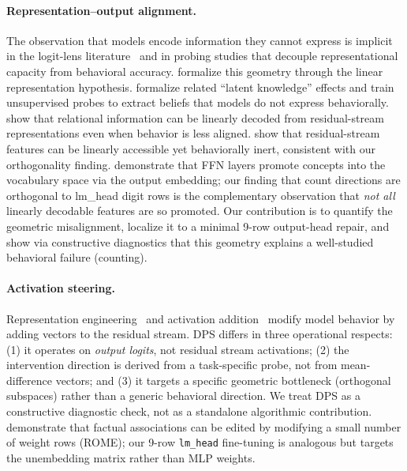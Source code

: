 \documentclass{article}
\begin{document}
\paragraph{Representation--output alignment.}
The observation that models encode information they cannot express is implicit in the
logit-lens literature~\citep{nostalgebraist2020logitlens,belrose2023eliciting} and in probing studies that
decouple representational capacity from behavioral accuracy.
\citet{park2023linear} formalize this geometry through the linear representation hypothesis.
\citet{burns2023discovering} formalize related ``latent knowledge'' effects and train
unsupervised probes to extract beliefs that models do not express behaviorally.
\citet{hernandez2024linearity} show that relational information can be linearly decoded
from residual-stream representations even when behavior is less aligned.
\citet{din2023jump} show that residual-stream features can be linearly accessible
yet behaviorally inert, consistent with our orthogonality finding.
\citet{geva2021transformer,geva2022transformer} demonstrate that FFN layers promote
concepts into the vocabulary space via the output embedding; our finding that
count directions are orthogonal to lm\_head digit rows is the complementary
observation that \emph{not all} linearly decodable features are so promoted.
Our contribution is to quantify the geometric misalignment, localize it to a minimal
9-row output-head repair, and show via constructive diagnostics that this geometry explains
a well-studied behavioral failure (counting).

\paragraph{Activation steering.}
Representation engineering~\citep{zou2023representation} and activation
addition~\citep{turner2023activation} modify model behavior by adding vectors to the
residual stream.
DPS differs in three operational respects: (1) it operates on \emph{output logits}, not residual
stream activations; (2) the intervention direction is derived from a task-specific probe,
not from mean-difference vectors; and (3) it targets a specific geometric bottleneck
(orthogonal subspaces) rather than a generic behavioral direction. We treat DPS as a
constructive diagnostic check, not as a standalone algorithmic contribution.
\citet{meng2022locating} demonstrate that factual associations can be edited by
modifying a small number of weight rows (ROME); our 9-row \texttt{lm\_head}
fine-tuning is analogous but targets the unembedding matrix rather than MLP weights.
\end{document}
